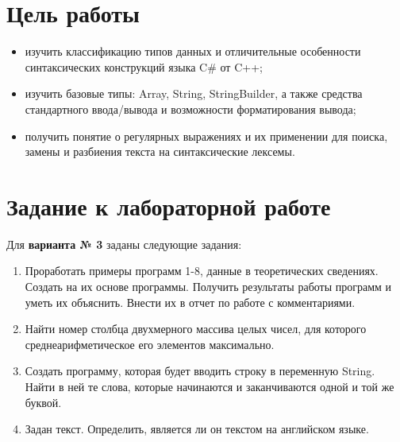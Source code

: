 \documentclass[a4paper,14pt]{extarticle}
\begin{document}
    \section{Цель работы}

    \begin{itemize}
        
        \item изучить классификацию типов данных и отличительные 
              особенности синтаксических конструкций языка C\# от C++;

        \item изучить базовые типы: Array, String, StringBuilder, а также
              средства стандартного ввода/вывода и возможности форматирования
              вывода;

        \item получить понятие о регулярных выражениях и их применении
              для поиска, замены и разбиения текста на синтаксические лексемы.

    \end{itemize}

    \section{Задание к лабораторной работе}

    Для \textbf{варианта № 3} заданы следующие задания:
    
    \begin{enumerate}
        
        \item Проработать примеры программ 1-8, данные в теоретических сведениях.
              Создать на их основе программы. Получить результаты работы программ
              и уметь их объяснить. Внести их в отчет по работе с комментариями.

        \item Найти номер столбца двухмерного массива целых чисел, для которого
              среднеарифметическое его элементов максимально.
              
        \item Создать программу, которая будет вводить строку в переменную String.
              Найти в ней те слова, которые начинаются и заканчиваются одной и 
              той же буквой.

        \item Задан текст. Определить, является ли он текстом на английском языке.

    \end{enumerate}
\end{document}
